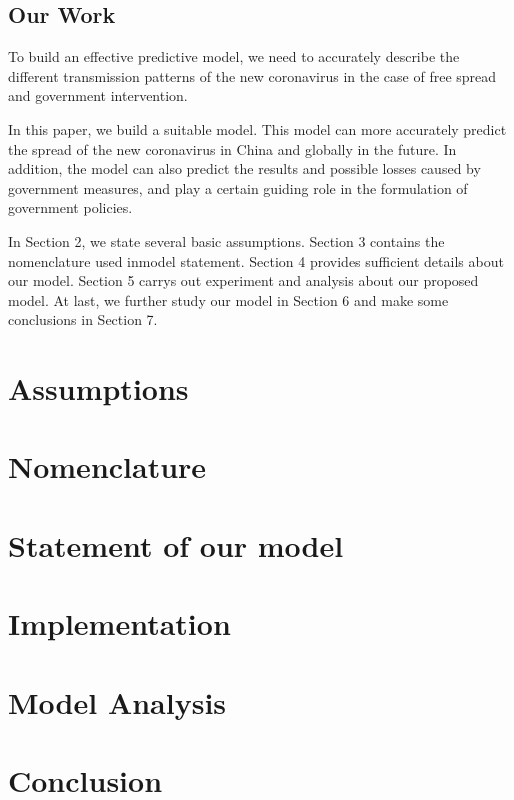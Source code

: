 \documentclass{mcmthesis}
\begin{document}
\subsection{Our Work}
	To build an effective predictive model, we need to accurately describe the different transmission patterns of the new coronavirus in the case of free spread and government intervention.

In this paper, we build a suitable model.  This model can more accurately predict the spread of the new coronavirus in China and globally in the future.  In addition, the model can also predict the results and possible losses caused by government measures, and play a certain guiding role in the formulation of government policies.

In Section 2, we state several basic assumptions.  Section 3 contains the nomenclature used inmodel statement.  Section 4 provides sufficient details about our model.  Section 5 carrys out experiment and analysis about our proposed model.  At last, we further study our model in Section 6 and make some conclusions in Section 7.
\section{Assumptions}
\section{Nomenclature}
\section{Statement of our model}
\section{Implementation}
\section{Model Analysis}
\section{Conclusion}
\newpage

\begin{appendices}


\end{appendices}
\end{document}
